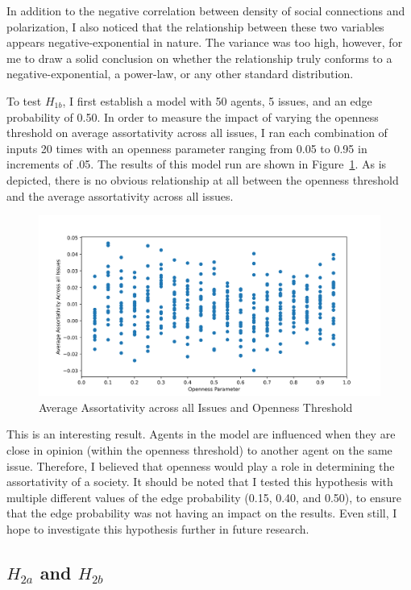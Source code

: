 In addition to the negative correlation between density of social connections
and polarization, I also noticed that the relationship between these two variables
appears negative-exponential in nature. The variance was too high, however, for
me to draw a solid conclusion on whether the relationship truly conforms to a
negative-exponential, a power-law, or any other standard distribution.

To test $H_{1b}$, I first establish a model with 50 agents, 5 issues, and an
edge probability of 0.50. In order to measure the impact of varying the
openness threshold on average assortativity across all issues, I ran each
combination of inputs 20 times with an openness parameter ranging from 0.05 to
0.95 in increments of .05. The results of this model run are shown in
Figure~\ref{H1b_plot}. As is depicted, there is no obvious relationship at all
between the openness threshold and the average assortativity across all issues. 

\begin{figure}
\centering
\includegraphics[width=1.0\columnwidth]{./Graphs/Assort_openness.png}
\caption{Average Assortativity across all Issues and Openness Threshold}
\label{H1b_plot}
\end{figure}

This is an interesting result. Agents in the model are influenced when they are
close in opinion (within the openness threshold) to another agent on the same
issue. Therefore, I believed that openness would play a role in determining the assortativity of a society. 
It should be noted that I tested this hypothesis with multiple different values of the edge probability (0.15,
0.40, and 0.50), to ensure that the edge probability was not having an impact
on the results. Even still, I hope to investigate this hypothesis further in future research. 

\subsection{$H_{2a}$ and $H_{2b}$}

